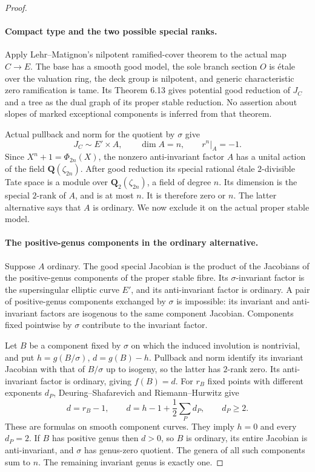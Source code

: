 \begin{proof}
\paragraph{Compact type and the two possible special ranks.}
Apply Lehr--Matignon's nilpotent ramified-cover theorem to
the actual map \(C\to E\). The base has a smooth good model,
the sole branch section \(O\) is \'{e}tale over the valuation
ring, the deck group is nilpotent, and generic characteristic
zero ramification is tame. Its Theorem 6.13 gives potential
good reduction of \(J_C\) and a tree as the dual graph
of its proper stable reduction.
\cite[Theorem 6.13]{fghLehrMatignon2005}
\cite[p.662]{fghSaidi2007}
No assertion about slopes of marked exceptional components
is inferred from that theorem.

Actual pullback and norm for the quotient by \(\sigma\)
give
\[
 J_C\sim E'\times A,\qquad \dim A=n,\qquad
                     r^n|_A=-1.                       \tag{A.75.5}
\]
Since \(X^n+1=\Phi_{2n}(X)\), the nonzero anti-invariant
factor \(A\) has a unital action of the field
\(\mathbf Q(\zeta_{2n})\). After good reduction its special
rational \'{e}tale \(2\)-divisible Tate space is a module
over \(\mathbf Q_2(\zeta_{2n})\), a field of degree \(n\).
Its dimension is the special \(2\)-rank of \(A\), and
is at most \(n\). It is therefore zero or \(n\).
The latter alternative says that \(A\) is ordinary.
We now exclude it on the actual proper stable model.

\paragraph{The positive-genus components in the ordinary alternative.}
Suppose \(A\) ordinary. The good special Jacobian is the
product of the Jacobians of the positive-genus components
of the proper stable fibre. Its \(\sigma\)-invariant
factor is the supersingular elliptic curve \(E'\), and
its anti-invariant factor is ordinary. A pair of positive-genus
components exchanged by \(\sigma\) is impossible: its
invariant and anti-invariant factors are isogenous to the
same component Jacobian. Components fixed pointwise by
\(\sigma\) contribute to the invariant factor.

Let \(B\) be a component fixed by \(\sigma\) on which
the induced involution is nontrivial, and put
\(h=g(B/\sigma)\), \(d=g(B)-h\). Pullback and norm
identify its invariant Jacobian with that of \(B/\sigma\)
up to isogeny, so the latter has \(2\)-rank zero. Its
anti-invariant factor is ordinary, giving \(f(B)=d\).
For \(r_B\) fixed points with different exponents \(d_P\),
Deuring--Shafarevich and Riemann--Hurwitz give
\[
 d=r_B-1,\qquad
 d=h-1+\frac12\sum_P d_P,
                         \qquad d_P\ge2.             \tag{A.75.6}
\]
\cite[Corollary 1.8]{fghCrew1984}
\cite[Proposition 1.4]{fghYang2024}
These are formulas on smooth component curves. They imply
\(h=0\) and every \(d_P=2\). If \(B\) has positive
genus then \(d>0\), so \(B\) is ordinary, its entire
Jacobian is anti-invariant, and \(\sigma\) has genus-zero
quotient. The genera of all such components sum to \(n\).
The remaining invariant genus is exactly one.


\end{proof}
